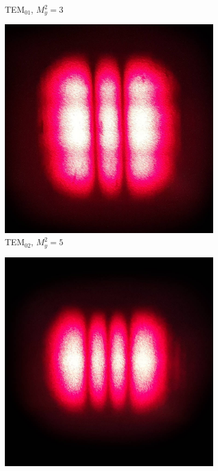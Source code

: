 \documentclass[a4paper,twoside,final]{article}
\begin{document}
\begin{figure}[ht!]
\begin{subfigure}[b!]{0.32\textwidth}
    \caption{TEM$_{01}$, $M_y^2 = 3$}
  \end{subfigure}
  \begin{subfigure}[b!]{0.32\textwidth}
    \includegraphics[width=\textwidth]{Bilder/TEM02_low.jpg}
    \caption{TEM$_{02}$, $M_y^2 = 5$}
  \end{subfigure}
  \begin{subfigure}[b!]{0.32\textwidth}
    \includegraphics[width=\textwidth]{Bilder/TEM03_low.jpg}

\end{subfigure}
\end{figure}
\end{document}
